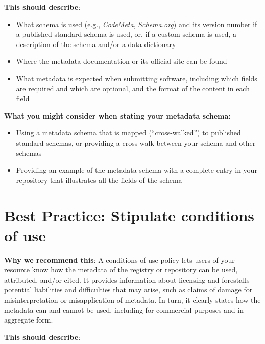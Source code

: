 \documentclass[11pt]{article}
\begin{document}
\textbf{This should describe}:

\begin{itemize}
\item What schema is used (e.g., \href{https://codemeta.github.io/}{\emph{CodeMeta}}, \href{https://schema.org/}{\emph{Schema.org}}) and its version number if a published standard schema is used, or, if a custom schema is used, a description of the schema and/or a data dictionary

\item Where the metadata documentation or its official site can be found

\item What metadata is expected when submitting software, including which fields are required and which are optional, and the format of the content in each field

\end{itemize}

\textbf{What you might consider when stating your metadata schema:}

\begin{itemize}
\item Using a metadata schema that is mapped (``cross-walked'') to published standard schemas, or providing a cross-walk between your schema and other schemas

\item Providing an example of the metadata schema with a complete entry in your repository that illustrates all the fields of the schema

\end{itemize}


\section{Best Practice: Stipulate conditions of use}
\label{best-practice-stipulate-conditions-of-use}

\textbf{Why we recommend this}: A conditions of use policy lets users of your resource know how the metadata of the registry or repository can be used, attributed, and/or cited. It provides information about licensing and forestalls potential liabilities and difficulties that may arise, such as claims of damage for misinterpretation or misapplication of metadata. In turn, it clearly states how the metadata can and cannot be used, including for commercial purposes and in aggregate form.

\textbf{This should describe}:
\end{document}
